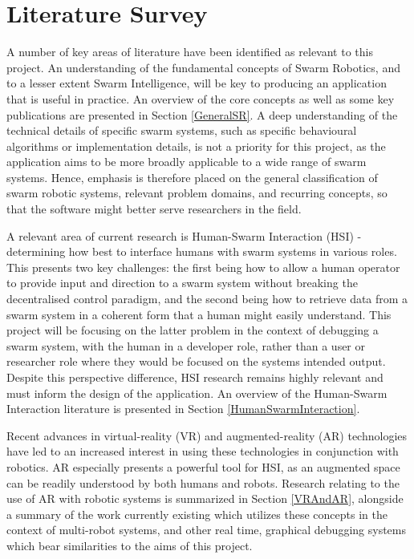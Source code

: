 \documentclass[titlepage,hidelinks,10pt]{article}
\begin{document}
\section{Literature Survey} \label{LitSurvey}
A number of key areas of literature have been identified as relevant to this project. An understanding of the fundamental concepts of Swarm Robotics, and to a lesser extent Swarm Intelligence, will be key to producing an application that is useful in practice. An overview of the core concepts as well as some key publications are presented in Section \ref{GeneralSR}. A deep understanding of the technical details of specific swarm systems, such as specific behavioural algorithms or implementation details, is not a priority for this project, as the application aims to be more broadly applicable to a wide range of swarm systems. Hence, emphasis is therefore placed on the general classification of swarm robotic systems, relevant problem domains, and recurring concepts, so that the software might better serve researchers in the field.

A relevant area of current research is Human-Swarm Interaction (HSI) - determining how best to interface humans with swarm systems in various roles. This presents two key challenges: the first being how to allow a human operator to provide input and direction to a swarm system without breaking the decentralised control paradigm\cite{HumanSwarmInteractionSurvey}, and the second being how to retrieve data from a swarm system in a coherent form that a human might easily understand\cite{DesginingInterfaces}. This project will be focusing on the latter problem in the context of debugging a swarm system, with the human in a developer role, rather than a user or researcher role where they would be focused on the systems intended output. Despite this perspective difference, HSI research remains highly relevant and must inform the design of the application. An overview of the Human-Swarm Interaction literature is presented in Section \ref{HumanSwarmInteraction}.

Recent advances in virtual-reality (VR) and augmented-reality (AR) technologies have led to an increased interest in using these technologies in conjunction with robotics. AR especially presents a powerful tool for HSI, as an augmented space can be readily understood by both humans and robots. Research relating to the use of AR with robotic systems is summarized in Section \ref{VRAndAR}, alongside a summary of the work currently existing which utilizes these concepts in the context of multi-robot systems, and other real time, graphical debugging systems which bear similarities to the aims of this project.
\end{document}
